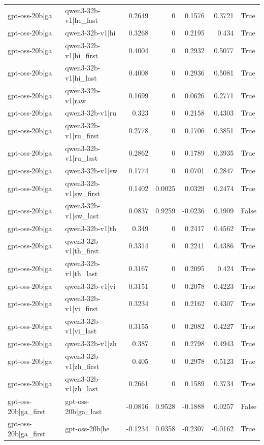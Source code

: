 \begin{table}
\begin{tabular}{l l r r r r l}
gpt-oss-20b|ga & qwen3-32b-v1|he_last & 0.2649 & 0 & 0.1576 & 0.3721 & True \\
gpt-oss-20b|ga & qwen3-32b-v1|hi & 0.3268 & 0 & 0.2195 & 0.434 & True \\
gpt-oss-20b|ga & qwen3-32b-v1|hi_first & 0.4004 & 0 & 0.2932 & 0.5077 & True \\
gpt-oss-20b|ga & qwen3-32b-v1|hi_last & 0.4008 & 0 & 0.2936 & 0.5081 & True \\
gpt-oss-20b|ga & qwen3-32b-v1|raw & 0.1699 & 0 & 0.0626 & 0.2771 & True \\
gpt-oss-20b|ga & qwen3-32b-v1|ru & 0.323 & 0 & 0.2158 & 0.4303 & True \\
gpt-oss-20b|ga & qwen3-32b-v1|ru_first & 0.2778 & 0 & 0.1706 & 0.3851 & True \\
gpt-oss-20b|ga & qwen3-32b-v1|ru_last & 0.2862 & 0 & 0.1789 & 0.3935 & True \\
gpt-oss-20b|ga & qwen3-32b-v1|sw & 0.1774 & 0 & 0.0701 & 0.2847 & True \\
gpt-oss-20b|ga & qwen3-32b-v1|sw_first & 0.1402 & 0.0025 & 0.0329 & 0.2474 & True \\
gpt-oss-20b|ga & qwen3-32b-v1|sw_last & 0.0837 & 0.9259 & -0.0236 & 0.1909 & False \\
gpt-oss-20b|ga & qwen3-32b-v1|th & 0.349 & 0 & 0.2417 & 0.4562 & True \\
gpt-oss-20b|ga & qwen3-32b-v1|th_first & 0.3314 & 0 & 0.2241 & 0.4386 & True \\
gpt-oss-20b|ga & qwen3-32b-v1|th_last & 0.3167 & 0 & 0.2095 & 0.424 & True \\
gpt-oss-20b|ga & qwen3-32b-v1|vi & 0.3151 & 0 & 0.2078 & 0.4223 & True \\
gpt-oss-20b|ga & qwen3-32b-v1|vi_first & 0.3234 & 0 & 0.2162 & 0.4307 & True \\
gpt-oss-20b|ga & qwen3-32b-v1|vi_last & 0.3155 & 0 & 0.2082 & 0.4227 & True \\
gpt-oss-20b|ga & qwen3-32b-v1|zh & 0.387 & 0 & 0.2798 & 0.4943 & True \\
gpt-oss-20b|ga & qwen3-32b-v1|zh_first & 0.405 & 0 & 0.2978 & 0.5123 & True \\
gpt-oss-20b|ga & qwen3-32b-v1|zh_last & 0.2661 & 0 & 0.1589 & 0.3734 & True \\
gpt-oss-20b|ga_first & gpt-oss-20b|ga_last & -0.0816 & 0.9528 & -0.1888 & 0.0257 & False \\
gpt-oss-20b|ga_first & gpt-oss-20b|he & -0.1234 & 0.0358 & -0.2307 & -0.0162 & True \\

\end{tabular}
\end{table}
